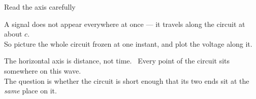 \documentclass[11pt,aspectratio=169]{beamer}
\begin{document}
\begin{frame}{Read the axis carefully}
  \vfill
  \begin{center}
    A signal does not appear everywhere at once --- it \alert{travels} along the circuit
    at about $c$.\\[6pt]
    {\large So picture the whole circuit \alert{frozen at one instant}, and plot the
     voltage \alert{along it}.}
  \end{center}
  \vfill
  \begin{center}
  \end{center}
  \vfill
  \begin{center}
    \alert{The horizontal axis is distance, not time.} \ Every point of the circuit sits
    somewhere on this wave.\\[4pt]
    The question is whether the circuit is \alert{short enough} that its two ends sit at
    the \emph{same} place on it.
  \end{center}
  \vfill
\end{frame}
\end{document}

